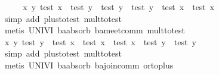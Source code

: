 \begin{isabellebody}
%
\isadelimproof
%
\endisadelimproof
%
\isatagproof
{}\isamarkupfalse%
\ {}\isanewline
\ \ \isamarkupfalse%
\ {}{}x\ y{}\ test\ x\ {}\ test\ y\ {}\ test\ y\ {}\ test\ y\ {}\ test\ x\ {}\ test\ x{}\isanewline
\ \ \ \ \isamarkupfalse%
\ {}simp\ add{}\ plus{}to{}test\ mult{}to{}test{}\isanewline
\ \ \ \ \isamarkupfalse%
\ {}metis\ UNIV{}I\ ba{}absorb{}\ ba{}meet{}comm\ mult{}to{}test{}\isanewline
\isanewline
\ \ \isamarkupfalse%
\ \isamarkupfalse%
\ {}{}x\ y{}\ test\ y\ {}\ test\ x\ {}\ test\ x\ {}\ test\ x\ {}\ test\ y\ {}\ test\ y{}\isanewline
\ \ \ \ \isamarkupfalse%
\ {}simp\ add{}\ plus{}to{}test\ mult{}to{}test{}\isanewline
\ \ \ \ \isamarkupfalse%
\ {}metis\ UNIV{}I\ ba{}absorb{}\ ba{}join{}comm\ or{}to{}plus{}\isanewline

\end{isabellebody}
